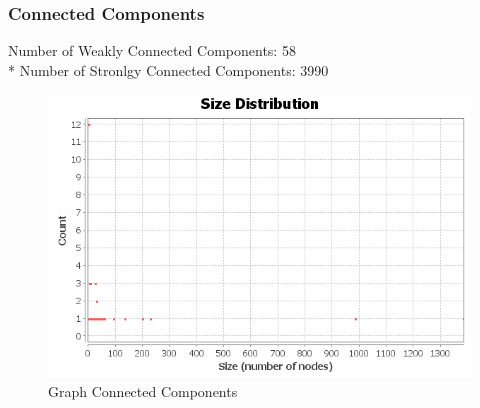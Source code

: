 \documentclass[12pt]{article}
\begin{document}
\subsubsection{Connected Components}
Number of Weakly Connected Components: 58\\*
Number of Stronlgy Connected Components: 3990
\begin{figure}[h!]
\includegraphics[scale=0.7]{../Q3/connected/cc-size-distribution}
\centering
\caption{Graph Connected Components}
\end{figure}
\newpage



\cite{*}
\end{document}
